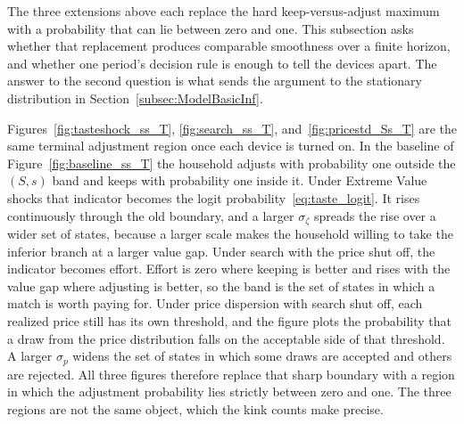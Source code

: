 The three extensions above each replace the hard keep-versus-adjust maximum with a probability that can lie between zero and one. This subsection asks whether that replacement produces comparable smoothness over a finite horizon, and whether one period's decision rule is enough to tell the devices apart. The answer to the second question is what sends the argument to the stationary distribution in Section~\ref{subsec:ModelBasicInf}.

Figures~\ref{fig:tasteshock_ss_T}, \ref{fig:search_ss_T}, and~\ref{fig:pricestd_Ss_T} are the same terminal adjustment region once each device is turned on. In the baseline of Figure~\ref{fig:baseline_ss_T} the household adjusts with probability one outside the $(S,s)$ band and keeps with probability one inside it. Under Extreme Value shocks that indicator becomes the logit probability~\eqref{eq:taste_logit}. It rises continuously through the old boundary, and a larger $\sigma_\zeta$ spreads the rise over a wider set of states, because a larger scale makes the household willing to take the inferior branch at a larger value gap. Under search with the price shut off, the indicator becomes effort. Effort is zero where keeping is better and rises with the value gap where adjusting is better, so the band is the set of states in which a match is worth paying for. Under price dispersion with search shut off, each realized price still has its own threshold, and the figure plots the probability that a draw from the price distribution falls on the acceptable side of that threshold. A larger $\sigma_p$ widens the set of states in which some draws are accepted and others are rejected. All three figures therefore replace that sharp boundary with a region in which the adjustment probability lies strictly between zero and one. The three regions are not the same object, which the kink counts make precise.

